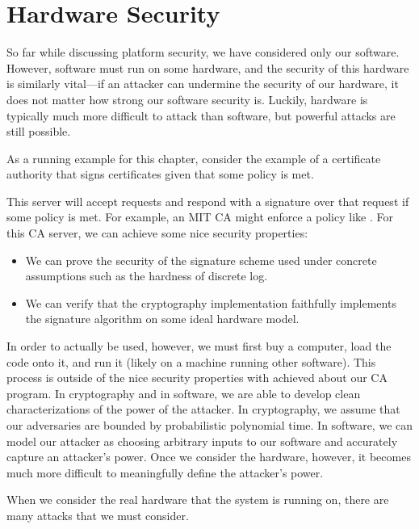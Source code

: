 \chapter{Hardware Security}

So far while discussing platform security, we have considered only our software. However, software must run on some hardware, and the security of this hardware is similarly vital---if an attacker can undermine the security of our hardware, it does not matter how strong our software security is. Luckily, hardware is typically much more difficult to attack than software, but powerful attacks are still possible.

As a running example for this chapter, consider the example of a certificate authority that signs certificates given that some policy is met.

This server will accept requests and respond with a signature over that request if some policy is met. For example, an MIT CA might enforce a policy like . For this CA server, we can achieve some nice security properties:
	\begin{itemize}
		\item We can prove the security of the signature scheme used under concrete assumptions such as the hardness of discrete log.
		\item We can verify that the cryptography implementation faithfully implements the signature algorithm on some ideal hardware model.
	\end{itemize}
In order to actually be used, however, we must first buy a computer, load the code onto it, and run it (likely on a machine running other software). This process is outside of the nice security properties with achieved about our CA program. In cryptography and in software, we are able to develop clean characterizations of the power of the attacker. In cryptography, we assume that our adversaries are bounded by probabilistic polynomial time. In software, we can model our attacker as choosing arbitrary inputs to our software and accurately capture an attacker's power. Once we consider the hardware, however, it becomes much more difficult to meaningfully define the attacker's power.


When we consider the real hardware that the system is running on, there are many attacks that we must consider.

